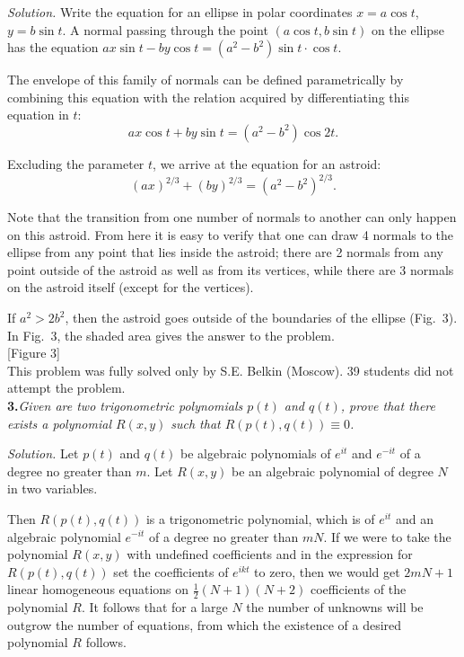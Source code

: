 \documentclass[12pt]{amsart}
\begin{document}
\textit{Solution.}
Write the equation for an ellipse in polar coordinates
$x=a\cos t$, $y=b\sin t$.
A normal passing through the point $(a\cos t,b\sin t)$ on the ellipse has the
equation $ax\sin t-by\cos t=(a^2-b^2)\sin t\cdot\cos t$.

The envelope of this family of normals can be defined parametrically by
combining this equation with the relation acquired by differentiating this
equation in $t$:
$$ax\cos t+by\sin t=(a^2-b^2)\cos 2t.$$

Excluding the parameter $t$, we arrive at the equation for an astroid:
$$(ax)^{2/3}+(by)^{2/3}=(a^2-b^2)^{2/3}.$$

Note that the transition from one number of normals to another can only
happen on this astroid.
From here it is easy to verify that one can draw 4 normals to the ellipse from
any point that lies inside the astroid; there are 2 normals from any point
outside of the astroid as well as from its vertices, while there are 3 normals
on the astroid itself (except for the vertices).

If $a^2>2b^2$, then the astroid goes outside of the boundaries of the ellipse
(Fig.~3).
In Fig.~3, the shaded area gives the answer to the problem.\\

[Figure 3]\\

This problem was fully solved only by S.E. Belkin (Moscow).
39 students did not attempt the problem.\\

\textbf{3.}\quad\textit{Given are two trigonometric polynomials $p(t)$ and
$q(t)$, prove that there exists a polynomial $R(x,y)$ such that
$R(p(t),q(t))\equiv0$.}

\textit{Solution.}
Let $p(t)$ and $q(t)$ be algebraic polynomials of $e^{it}$ and $e^{-it}$
of a degree no greater than $m$.
Let $R(x,y)$ be an algebraic polynomial of degree $N$ in two variables.

Then $R(p(t),q(t))$ is a trigonometric polynomial, which is of $e^{it}$ and an
algebraic polynomial $e^{-it}$ of a degree no greater than $mN$.
If we were to take the polynomial $R(x,y)$ with undefined coefficients and in
the expression for $R(p(t),q(t))$ set the coefficients of $e^{ikt}$ to zero,
then we would get $2mN+1$ linear homogeneous equations on
$\displaystyle\frac12(N+1)(N+2)$ coefficients of the polynomial $R$.
It follows that for a large $N$ the number of unknowns will be outgrow the
number of equations, from which the existence of a desired polynomial $R$
follows.
\end{document}
